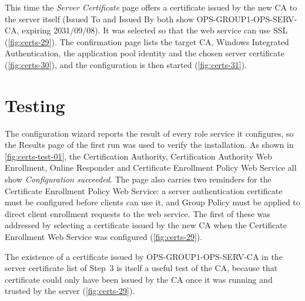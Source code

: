 
This time the \emph{Server Certificate} page offers a certificate issued by the new CA to the server itself (Issued To and Issued By both show OPS-GROUP1-OPS-SERV-CA, expiring 2031/09/08). It was selected so that the web service can use SSL (\autoref{fig:certs-29}). The confirmation page lists the target CA, Windows Integrated Authentication, the application pool identity and the chosen server certificate (\autoref{fig:certs-30}), and the configuration is then started (\autoref{fig:certs-31}).


\section{Testing}
\label{sec:certs-testing}
The configuration wizard reports the result of every role service it configures, so the Results page of the first run was used to verify the installation. As shown in \autoref{fig:certs-test-01}, the Certification Authority, Certification Authority Web Enrollment, Online Responder and Certificate Enrollment Policy Web Service all show \emph{Configuration succeeded}. The page also carries two reminders for the Certificate Enrollment Policy Web Service: a server authentication certificate must be configured before clients can use it, and Group Policy must be applied to direct client enrollment requests to the web service. The first of these was addressed by selecting a certificate issued by the new CA when the Certificate Enrollment Web Service was configured (\autoref{fig:certs-29}).

The existence of a certificate issued by OPS-GROUP1-OPS-SERV-CA in the server certificate list of Step~3 is itself a useful test of the CA, because that certificate could only have been issued by the CA once it was running and trusted by the server (\autoref{fig:certs-29}).

